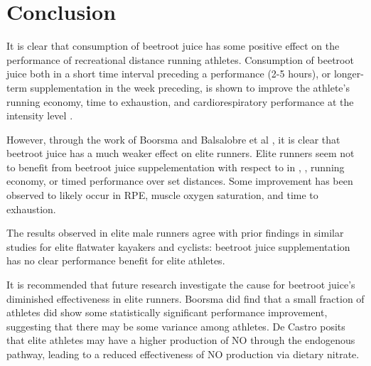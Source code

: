 \chapter{Conclusion}
It is clear that consumption of beetroot juice has some positive effect on the performance of recreational distance running athletes. Consumption of beetroot juice both in a short time interval preceding a performance (2-5 hours), or longer-term supplementation in the week preceding, is shown to improve the athlete's running economy, time to exhaustion, and cardiorespiratory performance at the \votmax intensity level
\cite{dominguez2017effects}.

However, through the work of Boorsma \cite{boorsma2013effect} and Balsalobre et al \cite{balsalobre2018effects}, it is clear that beetroot juice has a much weaker effect on elite runners. 
Elite runners seem not to benefit from beetroot juice suppelementation with respect to in \vot, \votmax, running economy, or timed performance over set distances. Some improvement has been observed to likely occur in RPE, muscle oxygen saturation, and time to exhaustion\cite{balsalobre2018effects}.

The results observed in elite male runners agree with prior findings in similar studies for elite flatwater kayakers\cite{muggeridge2013effects} and cyclists\cite{christensen2013influence}: beetroot juice supplementation has no clear  performance benefit for elite athletes.

It is recommended that future research investigate the cause for beetroot juice's diminished effectiveness in elite runners. Boorsma did find that a small fraction of athletes did show some statistically significant performance improvement, suggesting that there may be some variance among athletes. De Castro posits that elite athletes may have a higher production of $\mathrm{NO}$ through the endogenous pathway, leading to a reduced effectiveness of $\mathrm{NO}$ production via dietary nitrate\cite[13]{de2019effect}.